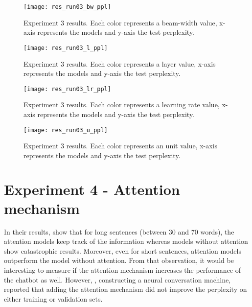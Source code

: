 \begin{landscape}
\begin{figure}
    \centering
    \texttt{[image: res\_run03\_bw\_ppl]}
    \decoRule
    \caption[Results experiment 3 BW-PPL]{Experiment 3 results. Each color represents a beam-width value, x-axis represents the models and y-axis the test perplexity.}
    \label{fig:res_run03_bw_ppl}
\end{figure}
\begin{figure}
    \centering
    \texttt{[image: res\_run03\_l\_ppl]}
    \decoRule
    \caption[Results experiment 3 L-PPL]{Experiment 3 results. Each color represents a layer value, x-axis represents the models and y-axis the test perplexity.}
    \label{fig:res_run03_l_ppl}
\end{figure}
\begin{figure}
    \centering
    \texttt{[image: res\_run03\_lr\_ppl]}
    \decoRule
    \caption[Results experiment 3 LR-PPL]{Experiment 3 results. Each color represents a learning rate value, x-axis represents the models and y-axis the test perplexity.}
    \label{fig:res_run03_lr_ppl}
\end{figure}
\begin{figure}
    \centering
    \texttt{[image: res\_run03\_u\_ppl]}
    \decoRule
    \caption[Results experiment 3 U-PPL]{Experiment 3 results. Each color represents an unit value, x-axis represents the models and y-axis the test perplexity.}
    \label{fig:res_run03_u_ppl}
\end{figure}
\end{landscape}

\section{Experiment 4 - Attention mechanism}
In their results, \citet{1508.04025} show that for long sentences (between 30 and 70 words), the attention models keep track of the information whereas models without attention show catastrophic results. Moreover, even for short sentences, attention models outperform the model without attention. From that observation, it would be interesting to measure if the attention mechanism increases the performance of the chatbot as well. However, \citet{1506.05869}, constructing a neural conversation machine, reported that adding the attention mechanism \citep{1409.0473} did not improve the perplexity on either training or validation sets.

